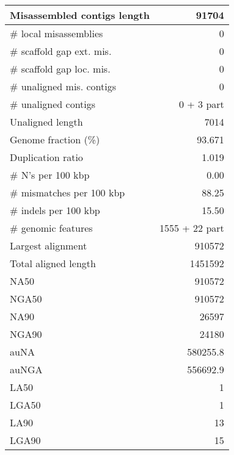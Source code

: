 \documentclass[12pt,a4paper]{article}
\begin{document}
\begin{table}[ht]
\begin{center}
\begin{tabular}{|l*{1}{|r}|}
Misassembled contigs length & 91704 \\ \hline
\# local misassemblies & 0 \\ \hline
\# scaffold gap ext. mis. & 0 \\ \hline
\# scaffold gap loc. mis. & 0 \\ \hline
\# unaligned mis. contigs & 0 \\ \hline
\# unaligned contigs & 0 + 3 part \\ \hline
Unaligned length & 7014 \\ \hline
Genome fraction (\%) & 93.671 \\ \hline
Duplication ratio & 1.019 \\ \hline
\# N's per 100 kbp & 0.00 \\ \hline
\# mismatches per 100 kbp & 88.25 \\ \hline
\# indels per 100 kbp & 15.50 \\ \hline
\# genomic features & 1555 + 22 part \\ \hline
Largest alignment & 910572 \\ \hline
Total aligned length & 1451592 \\ \hline
NA50 & 910572 \\ \hline
NGA50 & 910572 \\ \hline
NA90 & 26597 \\ \hline
NGA90 & 24180 \\ \hline
auNA & 580255.8 \\ \hline
auNGA & 556692.9 \\ \hline
LA50 & 1 \\ \hline
LGA50 & 1 \\ \hline
LA90 & 13 \\ \hline
LGA90 & 15 \\ \hline
\end{tabular}
\end{center}
\end{table}
\end{document}
